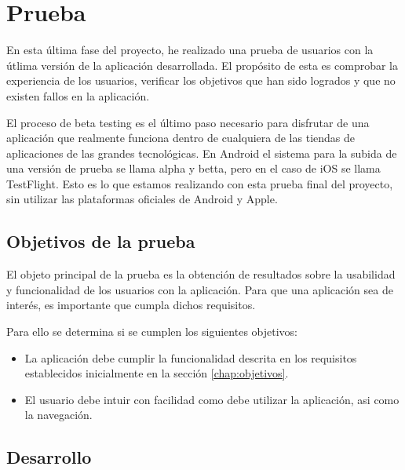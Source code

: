 \documentclass[a4paper, 12pt]{book}
\begin{document}

\cleardoublepage
\chapter{Prueba}

En esta \'ultima fase del proyecto, he realizado una prueba de usuarios con la \'utlima versi\'on de la aplicaci\'on desarrollada. El prop\'osito de esta es comprobar la experiencia de los usuarios, verificar los objetivos que han sido logrados y que no existen fallos en la aplicaci\'on. 

El proceso de beta testing es el \'ultimo paso necesario para disfrutar de una aplicaci\'on que realmente funciona dentro de cualquiera de las tiendas de aplicaciones de las grandes tecnol\'ogicas. En Android el sistema para la subida de una versi\'on de prueba se llama alpha y betta, pero en el caso de iOS se llama TestFlight. Esto es lo que estamos realizando con esta prueba final del proyecto, sin utilizar las plataformas oficiales de Android y Apple.

\section{Objetivos de la prueba} 
\label{sec:seguridad}

El objeto principal de la prueba es la obtenci\'on de resultados sobre la usabilidad y funcionalidad de los usuarios con la aplicaci\'on. Para que una aplicaci\'on sea de inter\'es, es importante que cumpla dichos requisitos.

Para ello se determina si se cumplen los siguientes objetivos:
\begin{itemize}
\item La aplicaci\'on debe cumplir la funcionalidad descrita en los requisitos establecidos inicialmente en la secci\'on \ref{chap:objetivos}.
\item El usuario debe intuir con facilidad como debe utilizar la aplicaci\'on, asi como la navegaci\'on.
\end{itemize}

\section{Desarrollo} 
\label{sec:seguridad}
\end{document}

